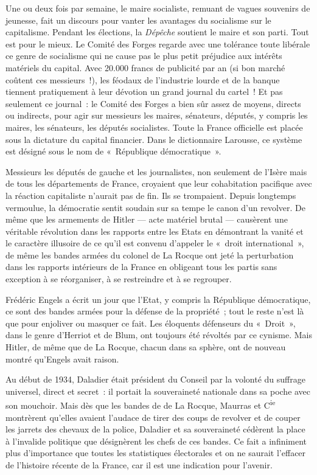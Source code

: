 \documentclass[french,twoside]{book} %
\begin{document}
Une ou deux fois par semaine, le maire socialiste, remuant  de vagues souvenirs de jeunesse, fait un discours pour vanter les avantages du socialisme sur le capitalisme. Pendant les élections, la \emph{Dépêche} soutient le maire et son parti. Tout est pour le mieux. Le Comité des Forges regarde avec une tolérance toute libérale ce genre de socialisme qui ne cause pas le plus petit préjudice aux intérêts matériels du capital. Avec 20.000 francs de publicité par an (si bon marché coûtent ces messieurs !), les féodaux de l’industrie lourde et de la banque tiennent pratiquement à leur dévotion un grand journal du cartel ! Et pas seulement ce journal : le Comité des Forges a bien sûr assez de moyens, directs ou indirects, pour agir sur messieurs les maires, sénateurs, députés, y compris les maires, les sénateurs, les députés socialistes. Toute la France officielle est placée sous la dictature du capital financier. Dans le dictionnaire Larousse, ce système est désigné sous le nom de « République démocratique ».\par
Messieurs les députés de gauche et les journalistes, non seulement de l’Isère mais de tous les départements de France, croyaient que leur cohabitation pacifique avec la réaction capitaliste n’aurait pas de fin. Ils se trompaient. Depuis longtemps vermoulue, la démocratie sentit soudain sur sa tempe le canon d’un revolver. De même que les armements de Hitler — acte matériel brutal — causèrent une véritable révolution dans les rapports entre les Etats en démontrant la vanité et le caractère illusoire de ce qu’il est convenu d’appeler le « droit international », de même les bandes armées du colonel de La Rocque ont jeté la perturbation dans les rapports intérieurs de la France en obligeant tous les partis sans exception à se réorganiser, à se restreindre et à se regrouper.\par
Frédéric Engels a écrit un jour que l’Etat, y compris la République démocratique, ce sont des bandes armées pour la défense de la propriété ; tout le reste n’est là que pour enjoliver ou masquer ce fait. Les éloquents  défenseurs du « Droit », dans le genre d’Herriot et de Blum, ont toujours été révoltés par ce cynisme. Mais Hitler, de même que de La Rocque, chacun dans sa sphère, ont de nouveau montré qu’Engels avait raison.\par
Au début de 1934, Daladier était président du Conseil par la volonté du suffrage universel, direct et secret : il portait la souveraineté nationale dans sa poche avec son mouchoir. Mais dès que les bandes de de La Rocque, Maurras et C\textsuperscript{ie} montrèrent qu’elles avaient l’audace de tirer des coups de revolver et de couper les jarrets des chevaux de la police, Daladier et sa souveraineté cédèrent la place à l’invalide politique que désignèrent les chefs de ces bandes. Ce fait a infiniment plus d’importance que toutes les statistiques électorales et on ne saurait l’effacer de l’histoire récente de la France, car il est une indication pour l’avenir.\par
\end{document}
